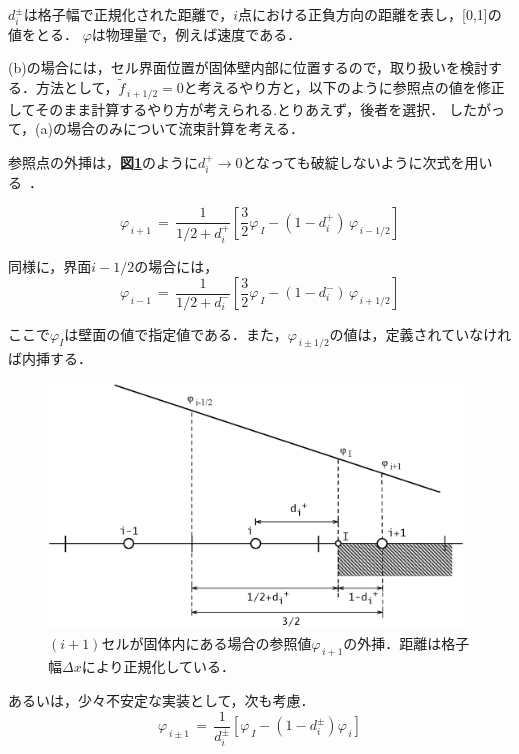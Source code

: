 \noindent $d_i^{\pm}$は格子幅で正規化された距離で，$i$点における正負方向の距離を表し，[0,1]の値をとる．
$\varphi$は物理量で，例えば速度である．

(b)の場合には，セル界面位置が固体壁内部に位置するので，取り扱いを検討する．方法として，$\tilde{f}_{\,i+1/2}=0$と考えるやり方と，以下のように参照点の値を修正してそのまま計算するやり方が考えられる.とりあえず，後者を選択．
したがって，(a)の場合のみについて流束計算を考える．

参照点の外挿は，\textbf{図\ref{fig:stable extrapolation}}のように$d_i^+\rightarrow0$となっても破綻しないように次式を用いる~\cite{akasaka:10:JSME}．

\begin{equation}
\varphi_{\,i+1} \,=\, \frac{1}{1/2+d_i^+} \left[ \frac{3}{2}\varphi_{\,I} - (1-d_i^+)\,\varphi_{\,i-1/2} \right]
\label{eq:stable extrapolation}
\end{equation}

\noindent 同様に，界面$i-1/2$の場合には，
\begin{equation}
\varphi_{\,i-1} \,=\, \frac{1}{1/2+d_i^-} \left[ \frac{3}{2}\varphi_{\,I} - (1-d_i^-)\,\varphi_{\,i+1/2} \right]
\label{eq:stable extrapolation-}
\end{equation}

\noindent ここで$\varphi_I$は壁面の値で指定値である．また，$\varphi_{\,i\pm1/2}$の値は，定義されていなければ内挿する．

\begin{figure}[htbp]
\begin{center}
\includegraphics[width=11cm,clip]{extrapolation_stable.eps}
\end{center}
\caption{$(i+1)$セルが固体内にある場合の参照値$\varphi_{\,i+1}$の外挿．距離は格子幅$\Delta x$により正規化している．}
\label{fig:stable extrapolation}
\end{figure}

あるいは，少々不安定な実装として，次も考慮．
\begin{equation}
\displaystyle{ \varphi_{\,i\pm1} \,=\, \frac{1}{d_i^{\pm}} \left[ \varphi_{\,I} - \left( 1 - d_i^{\pm} \right) \varphi_{\,i} \right] }
\label{eq:unstable}
\end{equation}


